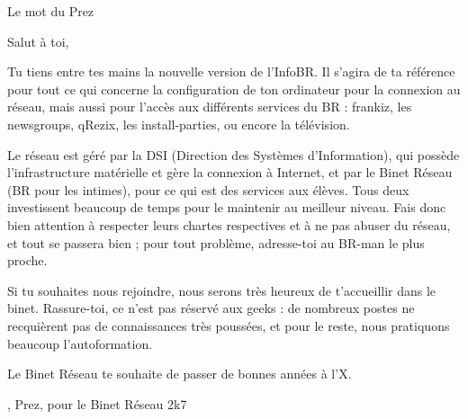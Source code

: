 

\begin{center}
    { \Huge Le mot du Prez }
\end{center}

\indent \indent Salut \`a toi,

Tu tiens entre tes mains la nouvelle version de l'InfoBR. Il s'agira de ta r\'ef\'erence pour tout ce qui concerne la configuration de ton ordinateur pour la connexion au r\'eseau, mais aussi pour l'acc\`es aux diff\'erents services du BR :
frankiz, les newsgroups, qRezix, les install-parties, ou encore la t\'el\'evision.

Le r\'eseau est g\'er\'e par la DSI (Direction des Syst\`emes d'Information), qui poss\`ede l'infrastructure mat\'erielle et g\`ere la connexion \`a Internet,
et par le Binet R\'eseau (BR pour les intimes), pour ce qui est des services aux \'el\`eves. Tous deux investissent beaucoup de temps pour le maintenir au meilleur niveau.
Fais donc bien attention \`a respecter leurs chartes respectives et \`a ne pas abuser du r\'eseau, et tout se passera bien ; pour tout probl\`eme, adresse-toi au
BR-man le plus proche.

Si tu souhaites nous rejoindre, nous serons tr\`es heureux de t'accueillir dans le binet. Rassure-toi, ce n'est pas r\'eserv\'e aux geeks : de nombreux postes ne recqui\`erent pas de connaissances tr\`es pouss\'ees, et pour le reste, nous pratiquons beaucoup l'autoformation.

Le Binet R\'eseau te souhaite de passer de bonnes ann\'ees \`a l'X.

\begin{flushright}
    , Prez, pour le Binet R\'eseau 2k7
\end{flushright}
